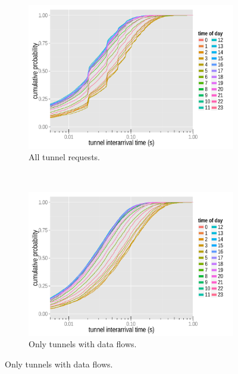 \begin{figure}[htb]
	\centering
	\begin{subfigure}[b]{0.5\textwidth}    
		\includegraphics[width=\textwidth]{images/R-IAT-successful-2h-ecdfs.pdf}
		\caption{All tunnel requests.}
		\label{c4:fig:IAT-ecdf-2h-successful}
	\end{subfigure}%
	~
	\begin{subfigure}[b]{0.5\textwidth}
		\includegraphics[width=\textwidth]{images/R-IAT-fromflows-ecdfs-2h.pdf}
		\caption{Only tunnels with data flows.}
		\label{c4:fig:IAT-ecdf-2h-active}
	\end{subfigure}


\end{figure}

